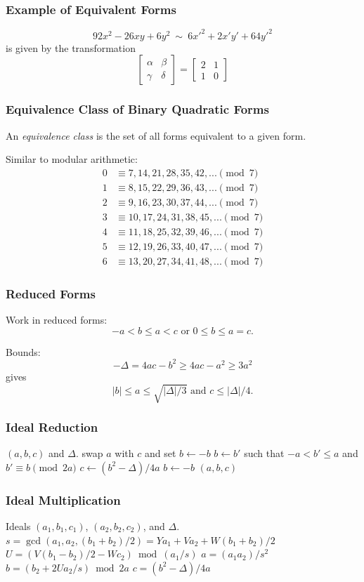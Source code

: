 \documentclass{beamer}
\newcommand{\matrixtt}[4]{\left[ \begin{array}{rr} #1 & #2 \\ #3 & #4 \end{array} \right]}
\begin{document}
\begin{frame}
\frametitle{Example of Equivalent Forms}
\[
92x^2-26xy+6y^2 ~ \sim ~ 6{x'}^2+2x'y'+64{y'}^2
\]
is given by the transformation
\[
\matrixtt{\alpha}{\beta}{\gamma}{\delta} = \matrixtt{2}{1}{1}{0}
\]
\end{frame}

\begin{frame}
\frametitle{Equivalence Class of Binary Quadratic Forms}
An \emph{equivalence class} is the set of all forms equivalent to a given form.

\bigbreak
Similar to modular arithmetic:
\begin{align*}
0 &\equiv 7, 14, 21, 28, 35, 42, ... \pmod 7 \\
1 &\equiv 8, 15, 22, 29, 36, 43, ... \pmod 7 \\
2 &\equiv 9, 16, 23, 30, 37, 44, ... \pmod 7 \\
3 &\equiv 10, 17, 24, 31, 38, 45, ... \pmod 7 \\
4 &\equiv 11, 18, 25, 32, 39, 46, ... \pmod 7 \\
5 &\equiv 12, 19, 26, 33, 40, 47, ... \pmod 7 \\
6 &\equiv 13, 20, 27, 34, 41, 48, ... \pmod 7
\end{align*}
\end{frame}

\begin{frame}
\frametitle{Reduced Forms}
Work in reduced forms:
\[
-a < b \le a < c \textrm{ or } 0 \le b \le a = c.
\]

\bigbreak
Bounds:
\[
-\Delta = 4ac - b^2 \ge 4ac-a^2 \ge 3a^2
\]
gives
\[
|b| \le a \le \sqrt{|\Delta|/3} \textrm{ and } c \le |\Delta|/4.
\]
\end{frame}

\begin{frame}
\frametitle{Ideal Reduction}
\begin{algorithmic}[1]
\Require $(a, b, c)$ and $\Delta$.
		\State swap $a$ with $c$ and set $b \gets -b$
	\EndIf
		\State $b \gets b'$ such that $-a < b' \le a$ and $b' \equiv b \pmod{2a}$
		\State $c \gets (b^2-\Delta)/4a$
	\EndIf
\EndWhile
{}
	\State $b \gets -b$
\EndIf
\State \Return $(a, b, c)$
\end{algorithmic}
\end{frame}


\begin{frame}
\frametitle{Ideal Multiplication}
\begin{algorithmic}[1]
\Require Ideals $(a_1, b_1, c_1)$, $(a_2, b_2, c_2)$, and $\Delta$.
\State $s = \gcd(a_1, a_2, (b_1+b_2)/2) = Ya_1 + Va_2 + W(b_1+b_2)/2$
\State $U = (V(b_1-b_2)/2 - Wc_2) \bmod{(a_1/s)}$
\State $a = (a_1a_2)/s^2$
\State $b = (b_2 + 2Ua_2/s) \bmod{2a}$
\State $c = (b^2 - \Delta)/4a$
\end{algorithmic}
\end{frame}
\end{document}
